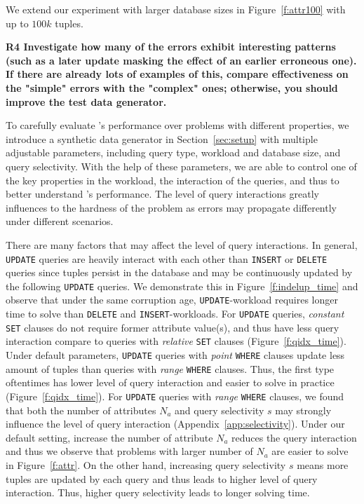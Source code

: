 We extend our experiment with larger database sizes in Figure~\ref{f:attr100} with up to $100k$ tuples. 

\noindent \textbf{R4 Investigate how many of the errors exhibit interesting patterns (such as a later update masking the effect of an earlier erroneous one). If there are already lots of examples of this, compare effectiveness on the "simple" errors with the "complex" ones; otherwise, you should improve the test data generator.}

To carefully evaluate \sys's performance over problems with different properties, we introduce a synthetic data generator in Section~\ref{sec:setup} with multiple adjustable parameters, including query type, workload and database size, and query selectivity. 
With the help of these parameters, we are able to control one of the key properties in the workload, the interaction of the queries, 
and thus to better understand \sys's performance. The level of query interactions greatly influences to the hardness of the problem as errors may propagate differently under different scenarios. 

There are many factors that may affect the level of query interactions. In general, \texttt{UPDATE} queries are heavily interact with each other than \texttt{INSERT} or \texttt{DELETE} queries since tuples persist in the database and may be continuously updated by the following \texttt{UPDATE} queries. We demonstrate this in Figure~\ref{f:indelup_time} and observe that under the same corruption age, \texttt{UPDATE}-workload requires longer time to solve than \texttt{DELETE} and \texttt{INSERT}-workloads. For \texttt{UPDATE} queries, \textit{constant} \texttt{SET} clauses do not require former attribute value(s), and thus have less query interaction compare to queries with \textit{relative} \texttt{SET} clauses (Figure~\ref{f:qidx_time}). Under default parameters, \texttt{UPDATE} queries with \textit{point} \texttt{WHERE} clauses update less amount of tuples than queries with \textit{range} \texttt{WHERE} clauses. Thus, the first type oftentimes has lower level of query interaction and easier to solve in practice (Figure~\ref{f:qidx_time}). For \texttt{UPDATE} queries with \textit{range} \texttt{WHERE} clauses, we found that both the number of attributes $N_a$ and query selectivity $s$ may strongly influence the level of query interaction (Appendix~\ref{app:selectivity}). Under our default setting, increase the number of attribute $N_a$ reduces the query interaction and thus we observe that problems with larger number of $N_a$ are easier to solve in Figure~\ref{f:attr}. On the other hand, increasing query selectivity $s$ means more tuples are updated by each query and thus leads to higher level of query interaction. Thus, higher query selectivity leads to longer solving time.



